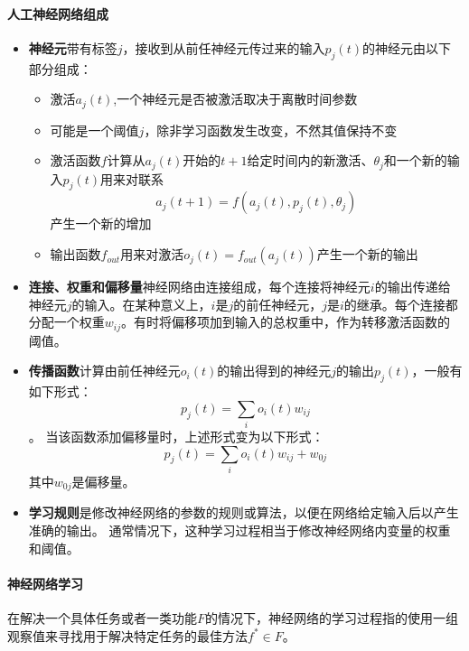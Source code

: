 \paragraph{人工神经网络组成}\cite{ wiki:Artificial_neural_network}
\begin{itemize}
  \item \textbf{神经元}带有标签$j$，接收到从前任神经元传过来的输入$ p_j(t)$的神经元由以下部分组成：
  \begin{itemize}
    \item 激活$a_j(t)$,一个神经元是否被激活取决于离散时间参数
    \item 可能是一个阈值$j$，除非学习函数发生改变，不然其值保持不变
    \item 激活函数$f$计算从$a_j(t)$开始的$t+1$给定时间内的新激活、$\theta_j$和一个新的输入$p_j(t)$用来对联系\begin{equation}a_{j}(t+1)=f\left(a_{j}(t), p_{j}(t), \theta_{j}\right)\end{equation}产生一个新的增加
    \item 输出函数$f_{out}$用来对激活$o_{j}(t)=f_{o u t}\left(a_{j}(t)\right)$产生一个新的输出
  \end{itemize}
  \item \textbf{连接、权重和偏移量}神经网络由连接组成，每个连接将神经元$i$的输出传递给神经元$j$的输入。在某种意义上，$i$是$j$的前任神经元，$j$是$i$的继承。每个连接都分配一个权重$w_{ij}$。有时将偏移项加到输入的总权重中，作为转移激活函数的阈值。
  \item \textbf{传播函数}计算由前任神经元$o_i(t)$的输出得到的神经元$j$的输出$p_j(t)$，一般有如下形式：
  \begin{equation}
    p_{j}(t)=\sum_{i} o_{i}(t) w_{i j}
  \end{equation}。
  当该函数添加偏移量时，上述形式变为以下形式：
  \begin{equation}
    p_{j}(t)=\sum_{i} o_{i}(t) w_{i j}+w_{0 j}
  \end{equation}其中$w_{0 j}$是偏移量。
  \item \textbf{学习规则}是修改神经网络的参数的规则或算法，以便在网络给定输入后以产生准确的输出。 通常情况下，这种学习过程相当于修改神经网络内变量的权重和阈值。
\end{itemize}

\paragraph{神经网络学习}\cite{ wiki:Artificial_neural_network}在解决一个具体任务或者一类功能$F$的情况下，神经网络的学习过程指的使用一组观察值来寻找用于解决特定任务的最佳方法$f^{*} \in F$。

